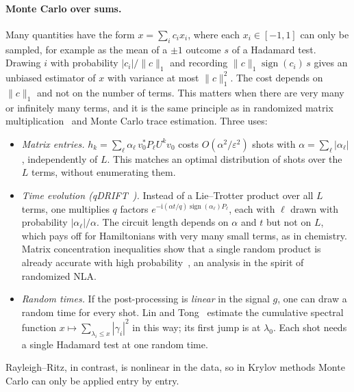 \documentclass[11pt,a4paper]{article}
\begin{document}
\paragraph{Monte Carlo over sums.} Many quantities have the form
$x=\sum_ic_ix_i$, where each $x_i\in[-1,1]$ can only be sampled, for example
as the mean of a $\pm1$ outcome $s$ of a Hadamard test. Drawing $i$ with
probability $|c_i|/\|c\|_1$ and recording $\|c\|_1\operatorname{sign}(c_i)\,s$ gives an
unbiased estimator of $x$ with variance at most $\|c\|_1^2$. The cost
depends on $\|c\|_1$ and not on the number of terms. This matters when
there are very many or infinitely many terms, and it is the same
principle as in randomized matrix multiplication~\cite{DKM06} and Monte
Carlo trace estimation. Three uses:
\begin{itemize}
\item \emph{Matrix entries.} $h_k=\sum_\ell\alpha_\ell\,v_0^*P_\ell U^kv_0$ costs
  $O(\alpha^2/\varepsilon^2)$ shots with $\alpha=\sum_\ell|\alpha_\ell|$, independently of
  $L$. This matches an optimal distribution of shots over the $L$ terms,
  without enumerating them.
\item \emph{Time evolution (qDRIFT~\cite{Cam19}).} Instead of a
  Lie--Trotter product over all $L$ terms, one multiplies $q$ factors
  $e^{-\mathrm{i}(\alpha t/q)\operatorname{sign}(\alpha_\ell)P_\ell}$, each with $\ell$ drawn with
  probability $|\alpha_\ell|/\alpha$. The circuit length depends on $\alpha$
  and $t$ but not on $L$, which pays off for Hamiltonians with very many
  small terms, as in chemistry. Matrix concentration inequalities show
  that a single random product is already accurate with high
  probability~\cite{CHKT21}, an analysis in the spirit of randomized NLA.
\item \emph{Random times.} If the post-processing is \emph{linear} in the
  signal $g$, one can draw a random time for every shot. Lin and
  Tong~\cite{LT22} estimate the cumulative spectral function
  $x\mapsto\sum_{\lambda_i\le x}|\gamma_i|^2$ in this way; its first jump is at
  $\lambda_0$. Each shot needs a single Hadamard test at one random time.
\end{itemize}
Rayleigh--Ritz, in contrast, is nonlinear in the data, so in Krylov
methods Monte Carlo can only be applied entry by entry.
\end{document}
